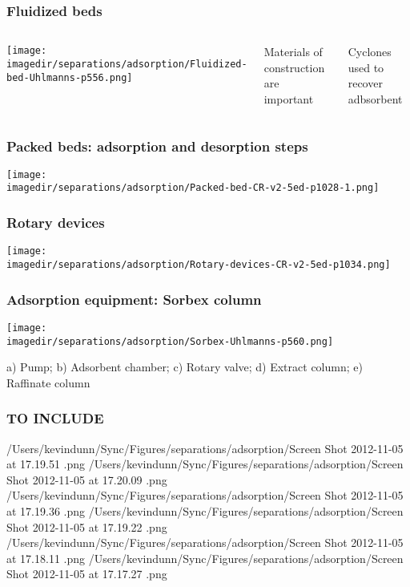 \begin{frame}\frametitle{Fluidized beds}
	\begin{columns}[t]
			\begin{center}
				\texttt{[image: \\imagedir/separations/adsorption/Fluidized-bed-Uhlmanns-p556.png]}
			\end{center}
			\vspace{-18pt}
			Materials of construction are important
			
			\vspace{12pt}
			Cyclones used to recover adbsorbent
	\end{columns}
	
\end{frame}

\begin{frame}\frametitle{Packed beds: adsorption and desorption steps}
	\begin{center}
		\texttt{[image: \\imagedir/separations/adsorption/Packed-bed-CR-v2-5ed-p1028-1.png]}
	\end{center}
\end{frame}

\begin{frame}\frametitle{Rotary devices}
	\begin{center}
		\texttt{[image: \\imagedir/separations/adsorption/Rotary-devices-CR-v2-5ed-p1034.png]}
	\end{center}
	\vspace{-12pt}
\end{frame}

\begin{frame}\frametitle{Adsorption equipment: Sorbex column}	
	\begin{center}
		\texttt{[image: \\imagedir/separations/adsorption/Sorbex-Uhlmanns-p560.png]}
	\end{center}
	
	{\scriptsize a) Pump; b) Adsorbent chamber; c) Rotary valve; d) Extract column; e) Raffinate column}
\end{frame}

\begin{frame}\frametitle{TO INCLUDE}
	/Users/kevindunn/Sync/Figures/separations/adsorption/Screen Shot 2012-11-05 at 17.19.51 .png
	/Users/kevindunn/Sync/Figures/separations/adsorption/Screen Shot 2012-11-05 at 17.20.09 .png
	/Users/kevindunn/Sync/Figures/separations/adsorption/Screen Shot 2012-11-05 at 17.19.36 .png
	/Users/kevindunn/Sync/Figures/separations/adsorption/Screen Shot 2012-11-05 at 17.19.22 .png
	/Users/kevindunn/Sync/Figures/separations/adsorption/Screen Shot 2012-11-05 at 17.18.11 .png
	/Users/kevindunn/Sync/Figures/separations/adsorption/Screen Shot 2012-11-05 at 17.17.27 .png
\end{frame}

